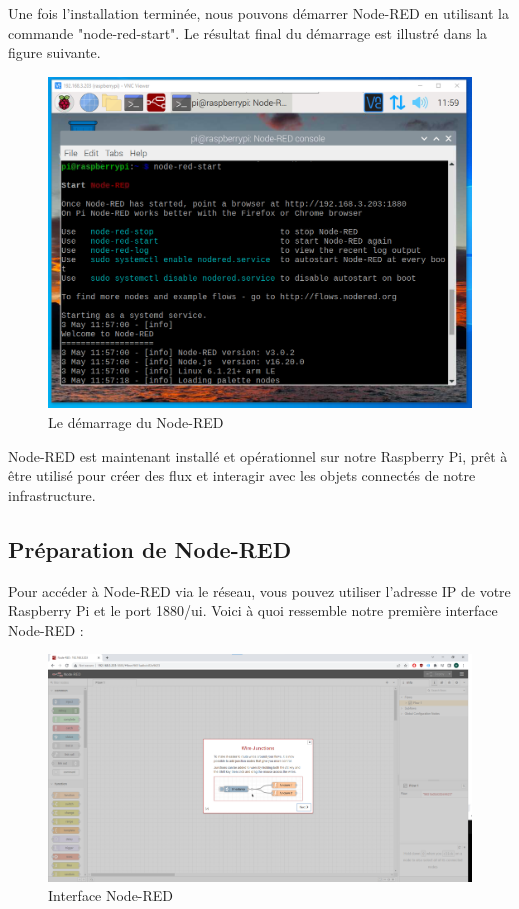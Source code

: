 Une fois l'installation terminée, nous pouvons démarrer Node-RED en utilisant la commande "node-red-start". Le résultat final du démarrage est illustré dans la figure suivante. \\


\begin{figure}[H]
 \centering
    \includegraphics[width=15cm]{Images/NodeRedStart1.png}
    \caption{Le démarrage du Node-RED}
    \label{Chap4.3.5}
\end{figure}    
\smallskip


Node-RED est maintenant installé et opérationnel sur notre Raspberry Pi, prêt à être utilisé pour créer des flux et interagir avec les objets connectés de notre infrastructure. \\



\subsection{Préparation de Node-RED}

Pour accéder à Node-RED via le réseau, vous pouvez utiliser l'adresse IP de votre Raspberry Pi et le port 1880/ui. Voici à quoi ressemble notre première interface Node-RED :

\begin{figure}[H]
\centering
\includegraphics[width=15cm]{Images/NodeRedInterface.png}
\caption{Interface Node-RED}
\label{Chap4.3.6}
\end{figure}

